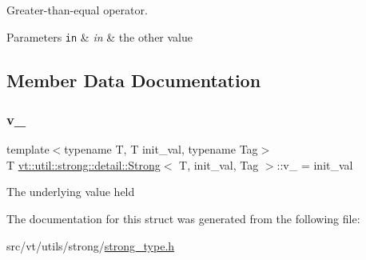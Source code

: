 Greater-\/than-\/equal operator. 


\begin{DoxyParams}[1]{Parameters}
\mbox{\tt in}  & {\em in} & the other value \\
\hline
\end{DoxyParams}


\subsection{Member Data Documentation}
\mbox{\label{structvt_1_1util_1_1strong_1_1detail_1_1_strong_a33b2c6727665a7c34405125870e71895}} 
\subsubsection{\texorpdfstring{v\+\_\+}{v\_}}
{\footnotesize\ttfamily template$<$typename T, T init\+\_\+val, typename Tag$>$ \\
T \hyperlink{structvt_1_1util_1_1strong_1_1detail_1_1_strong}{vt\+::util\+::strong\+::detail\+::\+Strong}$<$ T, init\+\_\+val, Tag $>$\+::v\+\_\+ = init\+\_\+val\hspace{0.3cm}{\ttfamily [private]}}

The underlying value held 

The documentation for this struct was generated from the following file\+:\begin{DoxyCompactItemize}
\item 
src/vt/utils/strong/\hyperlink{strong__type_8h}{strong\+\_\+type.\+h}\end{DoxyCompactItemize}
